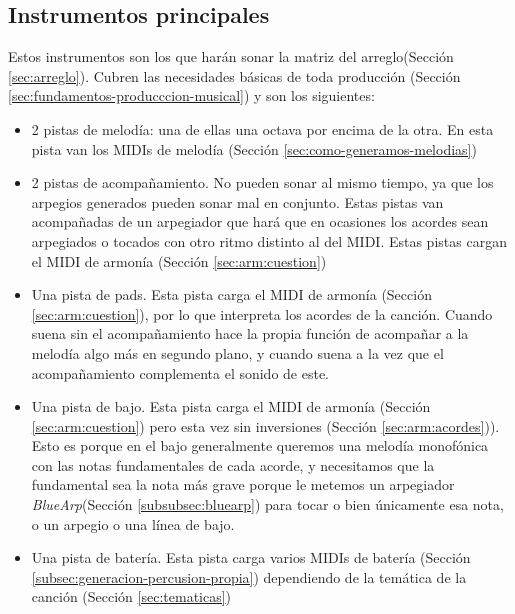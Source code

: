 \subsection{Instrumentos principales}
\label{subsec:instrumentos-principales}
Estos instrumentos son los que harán sonar la matriz del arreglo(Sección \ref{sec:arreglo}). Cubren las necesidades básicas de toda producción (Sección \ref{sec:fundamentos-producccion-musical}) y son los siguientes:


\begin{itemize}
\item 2 pistas de melodía: una de ellas una octava por encima de la otra. En esta pista van los MIDIs de melodía (Sección \ref{sec:como-generamos-melodias})
\item 2 pistas de acompañamiento. No pueden sonar al mismo tiempo, ya que los arpegios generados pueden sonar mal en conjunto. Estas pistas van acompañadas de un arpegiador que hará que en ocasiones los acordes sean arpegiados o tocados con otro ritmo distinto al del MIDI. Estas pistas cargan el MIDI de armonía (Sección \ref{sec:arm:cuestion})
\item Una pista de pads. Esta pista carga el MIDI de armonía (Sección \ref{sec:arm:cuestion}), por lo que interpreta los acordes de la canción. Cuando suena sin el acompañamiento hace la propia función de acompañar a la melodía algo más en segundo plano, y cuando suena a la vez que el acompañamiento complementa el sonido de este.
\item Una pista de bajo. Esta pista carga el MIDI de armonía (Sección \ref{sec:arm:cuestion}) pero esta vez sin inversiones (Sección \ref{sec:arm:acordes})). Esto es porque en el bajo generalmente queremos una melodía monofónica con las notas fundamentales de cada acorde, y necesitamos que la fundamental sea la nota más grave porque le metemos un arpegiador \textit{BlueArp}(Sección \ref{subsubsec:bluearp}) para tocar o bien únicamente esa nota, o un arpegio o una línea de bajo.
\item Una pista de batería. Esta pista carga varios MIDIs de batería (Sección \ref{subsec:generacion-percusion-propia}) dependiendo de la temática de la canción (Sección \ref{sec:tematicas})
\end{itemize}



